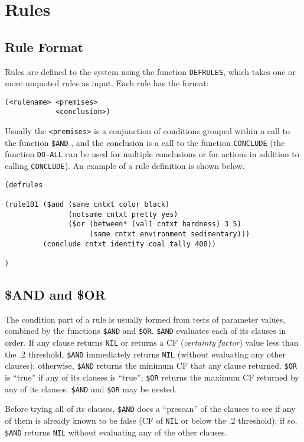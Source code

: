 \section{Rules}
\subsection{Rule Format}
Rules are defined to the system using the function {\tt DEFRULES}, which takes
one or more unquoted rules as input.  Each rule has the format:

\begin{verbatim}
(<rulename> <premises>
            <conclusion>)
\end{verbatim}

Usually the {\tt <premises>} is a conjunction of conditions grouped within
a call to the function {\tt \$AND} , and the conclusion is a call to the
function {\tt CONCLUDE} (the function {\tt DO-ALL} can be used for multiple
conclusions or for actions in addition to calling {\tt CONCLUDE}).  An example
of a rule definition is shown below.

\begin{verbatim}
(defrules

(rule101 ($and (same cntxt color black)
               (notsame cntxt pretty yes)
               ($or (between* (val1 cntxt hardness) 3 5)
                    (same cntxt environment sedimentary)))
         (conclude cntxt identity coal tally 400))

)
\end{verbatim}

\subsection{\$AND and \$OR}

The condition part of a rule is usually formed from tests of parameter values,
combined by the functions {\tt \$AND} and {\tt \$OR}.  {\tt \$AND} evaluates
each of its clauses in order.  If any clause returns {\tt NIL} or returns a CF
({\em certainty factor}) value less than the .2 threshold, {\tt \$AND}
immediately returns {\tt NIL} (without evaluating any other clauses);
otherwise, {\tt \$AND} returns the minimum CF that any clause returned.
{\tt \$OR} is ``true'' if any of its clauses is ``true''; {\tt \$OR} returns
the maximum CF returned by any of its clauses.  {\tt \$AND} and {\tt \$OR}
may be nested.

Before trying all of its clauses, {\tt \$AND} does a ``prescan'' of the clauses
to see if any of them is already known to be false (CF of {\tt NIL} or below
the .2 threshold); if so, {\tt \$AND} returns {\tt NIL} without evaluating any
of the other clauses.

